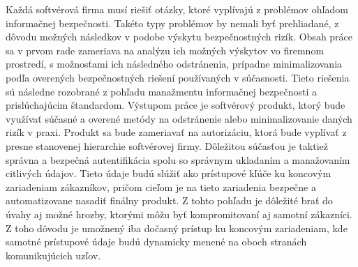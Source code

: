 \newpage
\thispagestyle{plain}

Každá softvérová firma musí riešiť otázky, ktoré vyplívajú z problémov ohľadom informačnej bezpečnosti. Takéto typy problémov
by nemali byť prehliadané, z dôvodu možných následkov v podobe výskytu bezpečnostných rizík. Obsah práce sa v prvom rade
zameriava na analýzu ich možných výskytov vo firemnom prostredí, s možnosťami ich následného odstránenia, prípadne minimalizovania
podľa overených bezpečnostných riešení používaných v súčasnosti. Tieto riešenia sú následne rozobrané z pohľadu manažmentu
informačnej bezpečnosti a prislúchajúcim štandardom. Výstupom práce je softvérový produkt, ktorý bude využívať súčasné a
overené metódy na odstránenie alebo minimalizovanie daných rizík v praxi. Produkt sa bude zameriavať na autorizáciu, ktorá
bude vyplívať z presne stanovenej hierarchie softvérovej firmy. Dôležitou súčasťou je taktiež správna a bezpečná autentifikácia
spolu so správnym ukladaním a manažovaním citlivých údajov. Tieto údaje budú slúžiť ako prístupové kľúče ku koncovým zariadeniam
zákazníkov, pričom cieľom je na tieto zariadenia bezpečne a automatizovane nasadiť finálny produkt. Z tohto pohľadu je dôležité
brať do úvahy aj možné hrozby, ktorými môžu byť kompromitovaní aj samotní zákazníci. Z toho dôvodu je umožnený iba dočasný
prístup ku koncovým zariadeniam, kde samotné prístupové údaje budú dynamicky menené na oboch stranách komunikujúcich uzľov.
\emptypage

